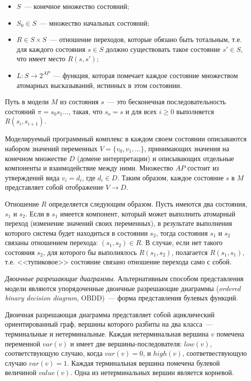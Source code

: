 \documentclass[a4paper,notitlepage,14pt]{article}
\begin{document}
\begin{itemize}
\item $S$~--- конечное множество состояний;
\item $S_0 \in S$~--- множество начальных состояний;
\item $R \in S \times S$~--- отношение переходов, которые обязано быть тотальным, т.е. для
  каждого состояния $s \in S$ должно существовать такое состояние $s' \in S$, что имеет
  место $R(s, s')$;
\item $L\colon S \rightarrow 2^{AP}$~--- функция, которая помечает каждое состояние
  множеством атомарных высказываний, истинных в этом состоянии.
\end{itemize}

Путь в модели $M$ из состояния $s$~--- это бесконечная последовательность состояний $\pi =
s_0 s_1 \ldots$, такая, что $s_o = s$ и для всех $i \geq 0$ выполняется $R(s_i, s_{i+1})$.

Моделируемый программный комплекс в каждом своем состоянии описываются набором значений
переменных $V = \{v_0, v_1, \ldots\}$, принимающих значения на конечном множестве $D$
(домене интерпретации) и описывающих отдельные компоненты и взаимодействие между
ними. Множество $AP$ состоит из утверждений вида $v_i = d_i$, где $d_i \in D$. Таким
образом, каждое состояние $s$ в $M$ представляет собой отображение $V \rightarrow D$.

Отношение $R$ определяется следующим образом. Пусть имеются два состояния, $s_1$ и
$s_2$. Если в $s_1$ имеется компонент, который может выполнить атомарный переход
(изменение значений своих переменных), в результате выполнения которого система будет
находиться в состоянии $s_2$, тогда состояния $s_1$ и $s_2$ связаны отношением перехода:
$(s_1, s_2) \in R$. В случае, если нет такого состояния $s_2$, для которого бы выполнялось
$R(s_1, s_2)$, полагается $R(s_1, s_1)$, т.е. <<тупиковое>> состояние связано отношение
перехода само с собой.

\textit{Двоичные разрешающие диаграммы}. Альтернативным способом представления модели
являются упорядоченные двоичные разрешающие диаграммы (\emph{ordered binary decision
  diagram}, OBDD)\cite{Clarke}~--- форма представления булевых функций.

Двоичная разрешающая диаграмма представляет собой ациклический ориентированный граф,
вершины которого разбиты на два класса~--- терминальные и нетерминальные. Каждая
нетерминальная вершина $v$ помечена переменной $var(v)$ и имеет две вершины-последователя:
$low(v)$, соответствующую случаю, когда $var(v) = 0$, и $high(v)$, соответвествующую
случаю $var(v) = 1$. Каждая терминальная вершина помечена булевой величиной
$value(v)$. Одна из нетерминальных вершин является корневой.
\end{document}
